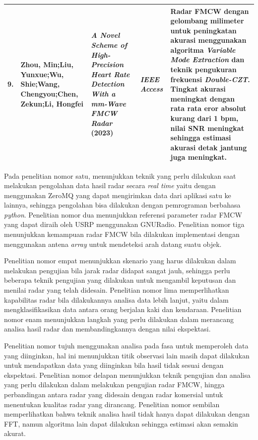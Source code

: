 \begin{center}
\begin{longtable}{|p{0.5cm}|p{2cm}|p{3cm}|p{2.5cm}|p{4cm}|}
	9. & Zhou, Min;\newline Liu, Yunxue;\newline Wu, Shie;\newline Wang, Chengyou;\newline Chen, Zekun;\newline Li, Hongfei
	& \textit{A Novel Scheme of High-Precision Heart Rate Detection With a mm-Wave FMCW Radar} (2023)
	& \textit{IEEE Access}
	& Radar FMCW dengan gelombang milimeter untuk peningkatan akurasi menggunakan algoritma \textit{Variable Mode Extraction} dan teknik pengukuran frekuensi \textit{Double-CZT}. Tingkat akurasi meningkat dengan rata rata eror absolut kurang dari 1 bpm, nilai SNR meningkat sehingga estimasi akurasi detak jantung juga meningkat.
	\\ \hline
	\end{longtable}
\end{center}

Pada penelitian nomor satu, menunjukkan teknik yang perlu dilakukan saat melakukan pengolahan data hasil radar secara \textit{real time} yaitu dengan menggunakan ZeroMQ yang dapat mengirimkan data dari aplikasi satu ke lainnya, sehingga pengolahan bisa dilakukan dengan pemrograman berbahasa \textit{python}. Penelitian nomor dua menunjukkan referensi parameter radar FMCW yang dapat diraih oleh USRP menggunakan GNURadio. Penelitian nomor tiga menunjukkan kemampuan radar FMCW bila dilakukan implementasi dengan menggunakan antena \textit{array} untuk mendeteksi arah datang suatu objek.

Penelitian nomor empat menunjukkan skenario yang harus dilakukan dalam melakukan pengujian bila jarak radar didapat sangat jauh, sehingga perlu beberapa teknik pengujian yang dilakukan untuk mengambil keputusan dan menilai radar yang telah didesain. Penelitian nomor lima memperlihatkan kapabilitas radar bila dilakukannya analisa data lebih lanjut, yaitu dalam mengklasifikasikan data antara orang berjalan kaki dan kendaraan. Penelitian nomor enam menunjukkan langkah yang perlu dilakukan dalam merancang analisa hasil radar dan membandingkannya dengan nilai ekspektasi.

Penelitian nomor tujuh menggunakan analisa pada fasa untuk memperoleh data yang diinginkan, hal ini menunjukkan titik observasi lain masih dapat dilakukan untuk mendapatkan data yang diinginkan bila hasil tidak sesuai dengan ekspektasi. Penelitian nomor delapan menunjukkan teknik pengujian dan analisa yang perlu dilakukan dalam melakukan pengujian radar FMCW, hingga perbandingan antara radar yang didesain dengan radar komersial untuk menentukan kualitas radar yang dirancang. Penelitian nomor sembilan memperlihatkan bahwa teknik analisa hasil tidak hanya dapat dilakukan dengan FFT, namun algoritma lain dapat dilakukan sehingga estimasi akan semakin akurat.

